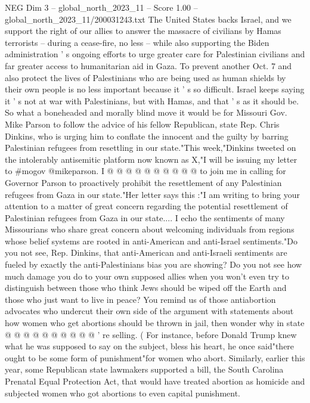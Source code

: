 \begin{textsample}{NEG Dim 3 – global\_north\_2023\_11 – Score 1.00 – global\_north\_2023\_11/200031243.txt}  \label{ex:f3_neg_275}
The United States backs Israel, and we support the right of our allies to answer the massacre of civilians by Hamas terrorists -- during a cease-fire, no less -- while also supporting the Biden administration ' s ongoing efforts to urge greater care for Palestinian civilians and far greater access to humanitarian aid in Gaza.
To prevent another Oct. 7 and also protect the lives of Palestinians who are being used as human shields by their own people is no less important because it ' s so difficult.
Israel keeps saying it ' s not at war with Palestinians, but with Hamas, and that ' s as it should be.
So what a boneheaded and morally blind move it would be for Missouri Gov.
Mike Parson to follow the advice of his fellow Republican, state Rep.
Chris Dinkins, who is urging him to conflate the innocent and the guilty by barring Palestinian refugees from resettling in our state."This week,"Dinkins tweeted on the intolerably antisemitic platform now known as X,"I will be issuing my letter to \#mogov @mikeparson.
I @ @ @ @ @ @ @ @ @ @ to join me in calling for Governor Parson to proactively prohibit the resettlement of any Palestinian refugees from Gaza in our state."Her letter says this :"I am writing to bring your attention to a matter of great concern regarding the potential resettlement of Palestinian refugees from Gaza in our state....
I echo the sentiments of many Missourians who share great concern about welcoming individuals from regions whose belief systems are rooted in anti-American and anti-Israel sentiments."Do you not see, Rep.
Dinkins, that anti-American and anti-Israeli sentiments are fueled by exactly the anti-Palestinians bias you are showing?
Do you not see how much damage you do to your own supposed allies when you won't even try to distinguish between those who think Jews should be wiped off the Earth and those who just want to live in peace?
You remind us of those antiabortion advocates who undercut their own side of the argument with statements about how women who get abortions should be thrown in jail, then wonder why in state @ @ @ @ @ @ @ @ @ @ ' re selling. ( For instance, before Donald Trump knew what he was supposed to say on the subject, bless his heart, he once said"there ought to be some form of punishment"for women who abort.
Similarly, earlier this year, some Republican state lawmakers supported a bill, the South Carolina Prenatal Equal Protection Act, that would have treated abortion as homicide and subjected women who got abortions to even capital punishment.

\end{textsample}
